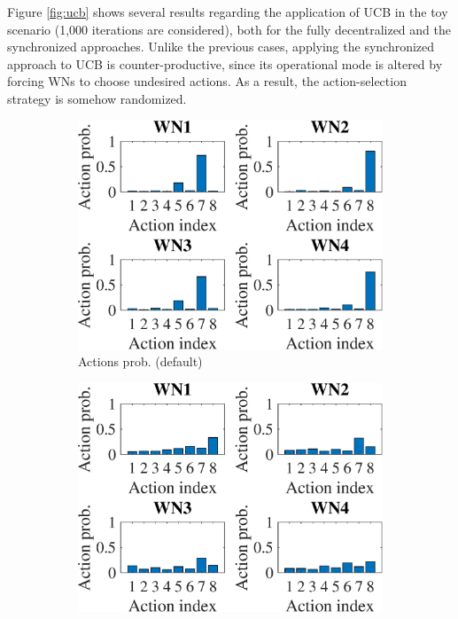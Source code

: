 \documentclass[preprint,12pt]{article}
\begin{document}
Figure \ref{fig:ucb} shows several results regarding the application of UCB in the toy scenario (1,000 iterations are considered), both for the fully decentralized and the synchronized approaches. Unlike the previous cases, applying the synchronized approach to UCB is counter-productive, since its operational mode is altered by forcing WNs to choose undesired actions. As a result, the action-selection strategy is somehow randomized.

\begin{figure}[h!]
	\centering
	\begin{subfigure}[b]{.33\textwidth}
		\includegraphics[width=\textwidth]{images/actions_probability_UCB}
		\caption{Actions prob. (default)}\label{fig:actions_probability_UCB}
	\end{subfigure}
	\begin{subfigure}[b]{.33\textwidth}
		\includegraphics[width=\textwidth]{images/actions_probability_OUCB}

\end{subfigure}
\end{figure}
\end{document}
